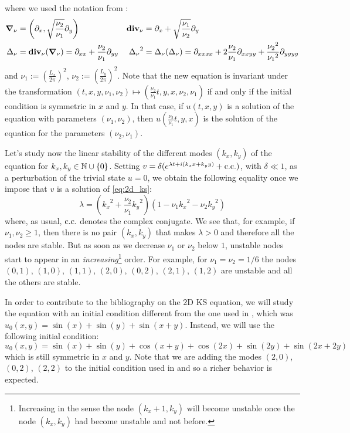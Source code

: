 \documentclass[twoside]{article}
\begin{document}
where we used the notation from \cite{Kalogirou2015}:
\begin{align}
  \grad_\nu & = \left(\partial_x , \sqrt{\frac{\nu_2}{\nu_1}} \partial_y
  \right)   & \operatorname{\boldsymbol{\mathrm{div}}}_\nu                                                   & = \partial_x + \sqrt{\frac{\nu_1}{\nu_2}} \partial_y
  \\ \Delta_\nu &= \operatorname{\boldsymbol{\mathrm{div}}}_\nu(\grad_\nu) = \partial_{xx} + \frac{\nu_2}{\nu_1} \partial_{yy} & {\Delta_\nu}^2 &= \Delta_\nu(\Delta_\nu) = \partial_{xxxx} + 2 \frac{\nu_2}{\nu_1} \partial_{xxyy} + \frac{{\nu_2}^2}{{\nu_1}^2} \partial_{yyyy}
\end{align}
and $\nu_1 :={\left( \frac{L_x}{2\pi} \right)}^2$, $\nu_2 := {\left( \frac{L_y}{2\pi} \right)}^2$. Note that the new equation is invariant under the transformation $(t,x,y, \nu_1, \nu_2) \mapsto \left( \frac{\nu_2}{\nu_1} t, y, x, \nu_2, \nu_1 \right)$ if and only if the initial condition is symmetric in $x$ and $y$. In that case, if $u(t,x,y)$ is a solution of the equation with parameters $(\nu_1, \nu_2)$, then $u\left( \frac{\nu_2}{\nu_1} t, y, x \right)$ is the solution of the equation for the parameters $(\nu_2, \nu_1)$.

Let's study now the linear stability of the different modes $(k_x, k_y)$ of the equation for $k_x,k_y\in\mathbb{N}\cup\{0\}$. Setting $v = \delta(e^{\lambda t+i(k_x x + k_y y)} + \mathrm{c.c.})$, with $\delta \ll 1$, as a perturbation of the trivial state $u = 0$, we obtain the following equality once we impose that $v$ is a solution of \cref{eq:2d_ks}:
\begin{equation}
  \lambda = \left({k_x}^2+ \frac{\nu_2}{\nu_1} {k_y}^2\right)\left( 1 - \nu_1{k_x}^2 - \nu_2{k_y}^2\right)
\end{equation}
where, as usual, $\mathrm{c.c.}$ denotes the complex conjugate.
We see that, for example, if $\nu_1, \nu_2 \geq 1$, then there is no pair $(k_x, k_y)$ that makes $\lambda > 0$ and therefore all the nodes are stable. But as soon as we decrease $\nu_1$ or $\nu_2$ below $1$, unstable nodes start to appear in an \emph{increasing}\footnote{Increasing in the sense the node $(k_x+1,k_y)$ will become unstable once the node $(k_x,k_y)$ had become unstable and not before.} order. For example, for $\nu_1=\nu_2=1/6$ the nodes $(0,1)$, $(1,0)$, $(1,1)$, $(2,0)$, $(0,2)$, $(2,1)$, $(1,2)$ are unstable and all the others are stable.

In order to contribute to the bibliography on the 2D KS equation, we will study the equation with an initial condition different from the one used in \cite{Kalogirou2015}, which was $u_0(x,y) = \sin(x) + \sin(y) + \sin(x+y)$. Instead, we will use the following initial condition:
\begin{equation}\label{eq:initial_condition}
  u_0(x,y) = \sin(x) + \sin(y) + \cos(x+y) + \cos(2x) + \sin(2y) + \sin(2x+2y)
\end{equation}
which is still symmetric in $x$ and $y$. Note that we are adding the modes $(2,0)$, $(0,2)$, $(2,2)$ to the initial condition used in \cite{Kalogirou2015} and so a richer behavior is expected.
\end{document}
